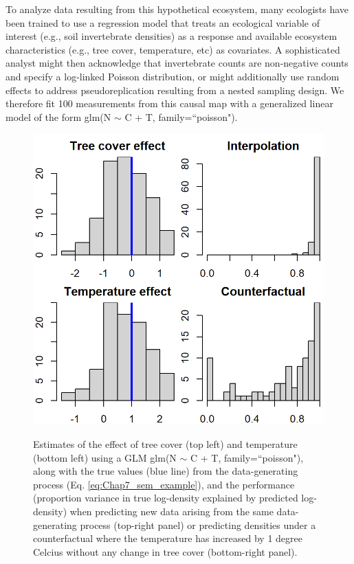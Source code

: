 To analyze data resulting from this hypothetical ecosystem, many ecologists have been trained to use a regression model that treats an ecological variable of interest (e.g., soil invertebrate densities) as a response and available ecosystem characteristics (e.g., tree cover, temperature, etc) as covariates.  A sophisticated analyst might then acknowledge that invertebrate counts are non-negative counts and specify a log-linked Poisson distribution, or might additionally use random effects to address pseudoreplication resulting from a nested sampling design.  We therefore fit 100 measurements from this causal map with a generalized linear model of the form \colorbox{backcolour}{glm(N $\sim$  C + T, family=``poisson")}.  

\begin{figure}[!ht]
    \caption[Simulated performance of a GLM when fitting a causal map]{Estimates of the effect of tree cover (top left) and temperature (bottom left) using a GLM \colorbox{backcolour}{glm(N $\sim$ C + T, family=``poisson")}, along with the true values (blue line) from the data-generating process (Eq. \ref{eq:Chap7_sem_example}), and the performance (proportion variance in true log-density explained by predicted log-density) when predicting new data arising from the same data-generating process (top-right panel) or predicting densities under a counterfactual where the temperature has increased by 1 degree Celcius without any change in tree cover (bottom-right panel).}
    \includegraphics[width=5.5in]{Chap_7/GLM_performance.png}
    \label{fig:Chap7_GLM_performance}
\end{figure}

